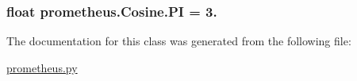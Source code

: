 \subsubsection[{P\+I}]{\setlength{\rightskip}{0pt plus 5cm}float prometheus.\+Cosine.\+P\+I = 3.\hspace{0.3cm}{\ttfamily [static]}}\label{classprometheus_1_1_cosine_a61a8ff3f53cb6132397f93bf73f89055}


The documentation for this class was generated from the following file\+:\begin{DoxyCompactItemize}
\item 
\hyperlink{prometheus_8py}{prometheus.\+py}\end{DoxyCompactItemize}
